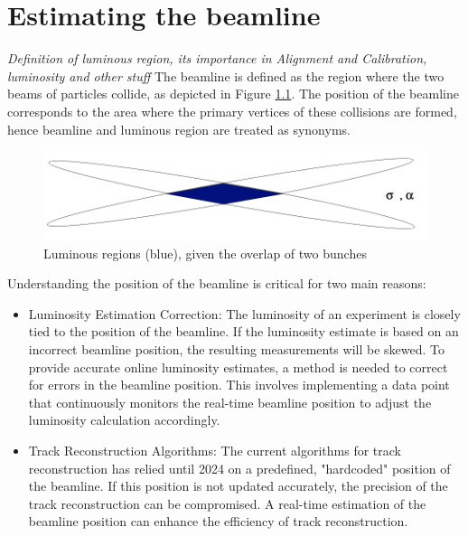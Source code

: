 \chapter{Estimating the beamline}
\textit{Definition of luminous region, its importance in Alignment and Calibration, luminosity and other stuff}
The beamline is defined as the region where the two beams of particles collide, as depicted in Figure \ref{fig:luminous-region}. The position of the beamline corresponds to the area where the primary vertices of these collisions are formed, hence beamline and luminous region are treated as synonyms.



\begin{figure}
    \centering
    \includegraphics[width=\textwidth]{figures/luminous_region.png}
    \caption{Luminous regions (blue), given the overlap of two bunches}
    \label{fig:luminous-region}
\end{figure}



Understanding the position of the beamline is critical for two main reasons:
\begin{itemize}
\item Luminosity Estimation Correction: The luminosity of an experiment is closely tied to the position of the beamline. If the luminosity estimate is based on an incorrect beamline position, the resulting measurements will be skewed. To provide accurate online luminosity estimates, a method is needed to correct for errors in the beamline position. This involves implementing a data point that continuously monitors the real-time beamline position to adjust the luminosity calculation accordingly.
\item Track Reconstruction Algorithms: The current algorithms for track reconstruction has relied until 2024 on a predefined, "hardcoded" position of the beamline. If this position is not updated accurately, the precision of the track reconstruction can be compromised. A real-time estimation of the beamline position can enhance the efficiency of track reconstruction.
\end{itemize}

